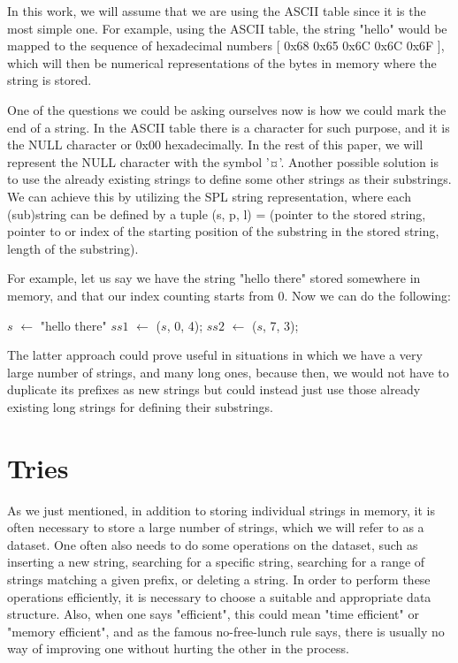 \documentclass[essay]{fer}
\begin{document}
In this work, we will assume that we are using the ASCII table since it is the most simple one. For example, using the ASCII table, the string "hello" would be mapped to the sequence of hexadecimal numbers [ 0x68 0x65 0x6C 0x6C 0x6F ],
which will then be numerical representations of the bytes in memory where the string is stored.

One of the questions we could be asking ourselves now is how we could mark the end of a string. In the ASCII table there is a character for such purpose, and it is the NULL character or 0x00 hexadecimally. In the rest of this paper, we will represent the NULL character with the symbol '¤'. Another possible solution is to use the already existing strings to define some other strings as their substrings. We can achieve this by utilizing the SPL string representation, where each (sub)string can be defined by a tuple (s, p, l) = (pointer to the stored string, pointer to or index of the starting position of the substring in the stored string, length of the substring).

For example, let us say we have the string "hello there" stored somewhere in memory, and that our index counting starts from 0. Now we can do the following:
\begin{algorithm}[h]
$s$ $\gets$ "hello there"\;
\;
$ss1$ $\gets$ ($s$, 0, 4); 
\;
$ss2$ $\gets$ ($s$, 7, 3); 
\end{algorithm}

The latter approach could prove useful in situations in which we have a very large number of strings, and many long ones, because then, we would not have to duplicate its prefixes as new strings but could instead just use those already existing long strings for defining their substrings.

\section{Tries}

As we just mentioned, in addition to storing individual strings in memory, it is often necessary to store a large number of strings, which we will refer to as a dataset.
One often also needs to do some operations on the dataset, such as inserting a new string, searching for a specific string,
searching for a range of strings matching a given prefix, or deleting a string.
In order to perform these operations efficiently, it is necessary to choose a suitable and appropriate data structure. Also, when one says "efficient", this could mean "time efficient" or "memory efficient", and as the famous no-free-lunch\cite{no_free_lunch_ref} rule says, there is usually no way of improving one without hurting the other in the process.
\end{document}
